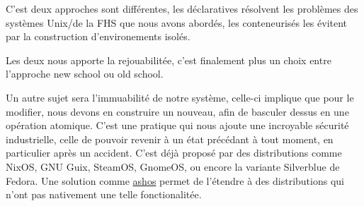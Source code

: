 \documentclass[a4paper,11pt]{article}
\begin{document}
\begin{blogmain}
C'est deux approches sont différentes, les déclaratives résolvent les problèmes des systèmes Unix/de la FHS que nous avons abordés, les conteneurisés les évitent par la construction d'environements isolés.

Les deux nous apporte la rejouabilitée, c'est finalement plus un choix entre l'approche new school ou old school.

Un autre sujet sera l'immuabilité de notre système, celle-ci implique que pour le modifier, nous devons en construire un nouveau, afin de basculer dessus en une opération atomique.
C'est une pratique qui nous ajoute une incroyable sécurité industrielle, celle de pouvoir revenir à un état précédant à tout moment, en particulier après un accident.
C'est déjà proposé par des distributions comme NixOS, GNU Guix, SteamOS, GnomeOS, ou encore la variante Silverblue de Fedora. Une solution comme \href{https://github.com/ashos/ashos}{ashos} permet de l'étendre à des distributions qui n'ont pas nativement une telle fonctionalitée.
\end{blogmain}
\end{document}

